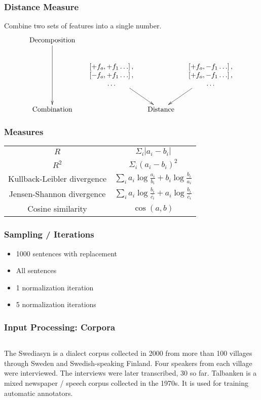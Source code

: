 \documentclass{beamer}
\begin{document}
\begin{frame}
  \frametitle{Distance Measure}
  Combine two sets of features into a single number.
\[\xymatrix@C=1pc{
\textrm{Decomposition}\ar@{>}[dd] &&&\\
 &
 *{\begin{array}{c}
     \left[ + f_o, +f_1 \ldots \right], \\
     \left[ - f_o, +f_1 \ldots \right], \\
     \ldots \\ \end{array}}
 \ar@{>}[dr]
 &&
 *{\begin{array}{c}
     \left[ + f_o, -f_1 \ldots \right], \\
     \left[ + f_o, -f_1 \ldots \right], \\
     \ldots \\ \end{array}}
 \ar@{>}[dl]  \\
 \textrm{Combination} && \textrm{Distance} & \\
} \]
\end{frame}
\begin{frame}
  \frametitle{Measures}
  \begin{tabular}{c|c}
  $R$ & $\Sigma_i |a_i - b_i|$ \\
  $R^2$ & $\Sigma_i (a_i - b_i)^2$ \\ \hline
  Kullback-Leibler divergence & $\sum_i {a_i \log\frac{a_i}{b_i} + b_i \log\frac{b_i}{a_i}}$ \\
  Jensen-Shannon divergence & $\sum_i {a_i \log\frac{b_i}{\bar{c_i}} + a_i \log\frac{b_i}{\bar{c_i}}}$ \\ \hline
  Cosine similarity & $\cos(a,b)$ \\
  \end{tabular}
\end{frame}
\begin{frame}
  \frametitle{Sampling / Iterations}
  \begin{itemize}
  \item 1000 sentences with replacement
  \item All sentences
 \end{itemize}
  \begin{itemize}
  \item 1 normalization iteration
  \item 5 normalization iterations
 \end{itemize}
\end{frame}
\begin{frame}
  \frametitle{Input Processing: Corpora}
  \begin{columns}
    The Swediasyn is a dialect corpus collected in 2000 from more than
    100 villages through Sweden and Swedish-speaking Finland. Four
    speakers from each village were interviewed. The interviews were
    later transcribed, 30 so far.
    Talbanken is a mixed newspaper / speech corpus collected in the
    1970s. It is used for training automatic annotators.
  \end{columns}
\end{frame}
\end{document}
